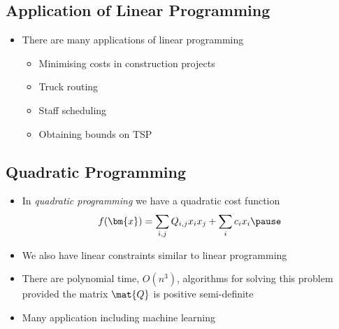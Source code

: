 \begin{slide}
\section{Application of Linear Programming}

\begin{PauseHighLight}
  \begin{itemize}
  \item There are many applications of linear programming\pause
    \begin{itemize}
    \item Minimising costs in construction projects
    \item Truck routing
    \item Staff scheduling
    \item Obtaining bounds on TSP\pause
    \end{itemize}
  \end{itemize}
\end{PauseHighLight}

\end{slide}



\begin{slide}
\section{Quadratic Programming}

\begin{PauseHighLight}
  \begin{itemize}
  \item In \emph{quadratic programming} we have a quadratic cost function
    \begin{align*}
      f(\bm{x}) = \sum_{i,j} Q_{i,j} x_i x_j + \sum_i c_i x_i\pause
    \end{align*}
  \item We also have linear constraints similar to linear
    programming\pause
  \item There are polynomial time, $O(n^3)$, algorithms for solving
    this problem provided the matrix $\mat{Q}$ is positive
    semi-definite\pause
  \item Many application including machine learning\pause
  \end{itemize}
\end{PauseHighLight}

\end{slide}


